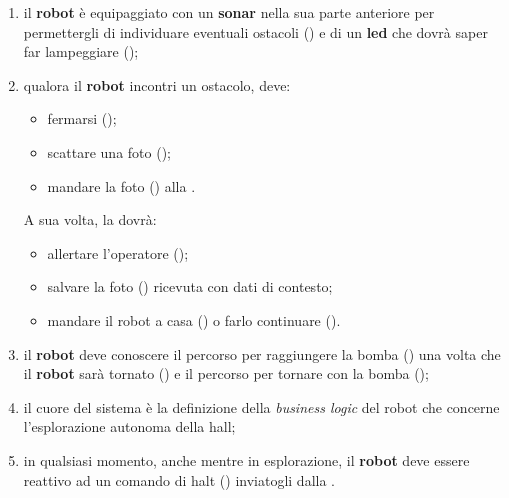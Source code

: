 \begin{enumerate}
  \item
    il \textbf{robot } è equipaggiato con un \textbf{sonar} nella sua parte anteriore per permettergli di individuare eventuali ostacoli () e di un \textbf{led} che dovrà saper far lampeggiare ();

  \item
    qualora il \textbf{robot } incontri un ostacolo, deve:
    \begin{itemize}
      \item fermarsi ();
      \item scattare una foto ();
      \item mandare la foto () alla \textbf{}.
    \end{itemize}
    A sua volta, la \textbf{} dovrà:
    \begin{itemize}
      \item allertare l'operatore ();
      \item salvare la foto () ricevuta con dati di contesto;
      \item mandare il robot a casa () o farlo continuare ().
    \end{itemize}

  \item
    il \textbf{robot } deve conoscere il percorso per raggiungere la bomba () una volta che il \textbf{robot } sarà tornato () e il percorso per tornare con la bomba ();

  \item
    il cuore del sistema è la definizione della \textit{business logic} del robot che concerne l'esplorazione autonoma della hall;

  \item
    in qualsiasi momento, anche mentre in esplorazione, il \textbf{robot } deve essere reattivo ad un comando di halt () inviatogli dalla \textbf{}.
\end{enumerate}
